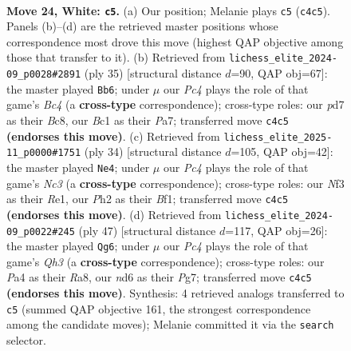 \documentclass[11pt]{article}
\begin{document}
\clearpage

\begin{figure}[p]\centering
\begin{subfigure}{0.46\textwidth}\centering
\resizebox{\linewidth}{!}{%
\newchessgame
\chessboard[
  setfen={2bqrb1k/rp1p3p/p2npp2/7Q/P1PP2B1/2N2N2/1P3P1P/R1B2RK1 w - - 0 24},
  showmover=false,
  pgfstyle=straightmove, color=movearrow, markmove={c4-c5}
]}
\caption{}
\end{subfigure}\hfill
\begin{subfigure}{0.46\textwidth}\centering
\resizebox{\linewidth}{!}{%
\newchessgame
\chessboard[
  setfen={r1b2rk1/pppn2pp/6q1/2bPp3/4P3/5PNB/PPQ4P/R1B2R1K b - - 2 18},
  showmover=false,
  pgfstyle=straightmove, color=movearrow, markmove={c5-b6}
]}
\caption{}
\end{subfigure}
\\[4pt]
\begin{subfigure}{0.46\textwidth}\centering
\resizebox{\linewidth}{!}{%
\newchessgame
\chessboard[
  setfen={r1b1kb1r/1pq2pn1/p3p2p/4P1p1/3N4/2N2QP1/PPP4P/2K1RB1R w kq - 3 18},
  showmover=false,
  pgfstyle=straightmove, color=movearrow, markmove={c3-e4}
]}
\caption{}
\end{subfigure}\hfill
\begin{subfigure}{0.46\textwidth}\centering
\resizebox{\linewidth}{!}{%
\newchessgame
\chessboard[
  setfen={r3r1k1/1p3ppp/2pb3q/p7/PnBPb3/4PN2/1B2QPPP/R2R2K1 b - - 15 24},
  showmover=false,
  pgfstyle=straightmove, color=movearrow, markmove={h6-g6}
]}
\caption{}
\end{subfigure}
\caption{\textbf{Move 24, White: \texttt{c5}.} (a) Our position; Melanie plays \texttt{c5} (\texttt{c4c5}). Panels (b)--(d) are the retrieved master positions whose correspondence most drove this move (highest QAP objective among those that transfer to it). (b) Retrieved from \texttt{lichess\_elite\_2024-09\_p0028\#2891} (ply 35) [structural distance $d$=90, QAP obj=67]: the master played \texttt{Bb6}; under $\mu$ our \emph{Pc4} plays the role of that game's \emph{Bc4} (a \textbf{cross-type} correspondence); cross-type roles: our \emph{p}d7 as their \emph{B}c8, our \emph{B}c1 as their \emph{P}a7; transferred move \texttt{c4c5} \textbf{(endorses this move)}. (c) Retrieved from \texttt{lichess\_elite\_2025-11\_p0000\#1751} (ply 34) [structural distance $d$=105, QAP obj=42]: the master played \texttt{Ne4}; under $\mu$ our \emph{Pc4} plays the role of that game's \emph{Nc3} (a \textbf{cross-type} correspondence); cross-type roles: our \emph{N}f3 as their \emph{R}e1, our \emph{P}h2 as their \emph{B}f1; transferred move \texttt{c4c5} \textbf{(endorses this move)}. (d) Retrieved from \texttt{lichess\_elite\_2024-09\_p0022\#245} (ply 47) [structural distance $d$=117, QAP obj=26]: the master played \texttt{Qg6}; under $\mu$ our \emph{Pc4} plays the role of that game's \emph{Qh3} (a \textbf{cross-type} correspondence); cross-type roles: our \emph{P}a4 as their \emph{R}a8, our \emph{n}d6 as their \emph{P}g7; transferred move \texttt{c4c5} \textbf{(endorses this move)}. Synthesis: 4 retrieved analogs transferred to \texttt{c5} (summed QAP objective 161, the strongest correspondence among the candidate moves); Melanie committed it via the \texttt{search} selector.}

\end{figure}
\end{document}

